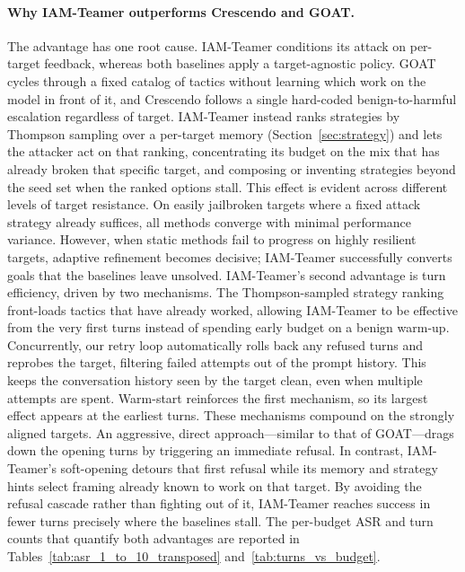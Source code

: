 \paragraph{Why IAM-Teamer outperforms Crescendo and GOAT.}
The advantage has one root cause.
IAM-Teamer conditions its attack on per-target feedback, whereas both baselines apply a target-agnostic policy.
GOAT cycles through a fixed catalog of tactics without learning which work on the model in front of it, and Crescendo follows a single hard-coded benign-to-harmful escalation regardless of target.
IAM-Teamer instead ranks strategies by Thompson sampling over a per-target memory (Section~\ref{sec:strategy}) and lets the attacker act on that ranking, concentrating its budget on the mix that has already broken that specific target, and composing or inventing strategies beyond the seed set when the ranked options stall.
This effect is evident across different levels of target resistance.
On easily jailbroken targets where a fixed attack strategy already suffices, all methods converge with minimal performance variance.
However, when static methods fail to progress on highly resilient targets, adaptive refinement becomes decisive; IAM-Teamer successfully converts goals that the baselines leave unsolved.
IAM-Teamer's second advantage is turn efficiency, driven by two mechanisms.
The Thompson-sampled strategy ranking front-loads tactics that have already worked, allowing IAM-Teamer to be effective from the very first turns instead of spending early budget on a benign warm-up. Concurrently, our retry loop automatically rolls back any refused turns and reprobes the target, filtering failed attempts out of the prompt history. This keeps the conversation history seen by the target clean, even when multiple attempts are spent.
Warm-start reinforces the first mechanism, so its largest effect appears at the earliest turns.
These mechanisms compound on the strongly aligned targets.
An aggressive, direct approach---similar to that of GOAT---drags down the opening turns by triggering an immediate refusal.
In contrast, IAM-Teamer's soft-opening detours that first refusal while its memory and strategy hints select framing already known to work on that target.
By avoiding the refusal cascade rather than fighting out of it, IAM-Teamer reaches success in fewer turns precisely where the baselines stall.
The per-budget ASR and turn counts that quantify both advantages are reported in Tables~\ref{tab:asr_1_to_10_transposed} and~\ref{tab:turns_vs_budget}.

